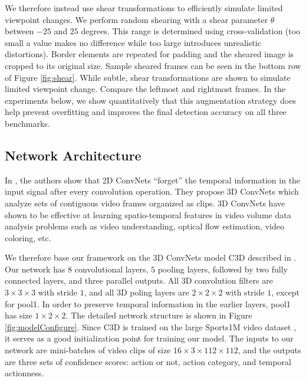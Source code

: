 \documentclass[10pt,twocolumn,letterpaper]{article}
\begin{document}
We therefore instead use shear transformations to efficiently simulate limited viewpoint changes. We perform random shearing with a shear parameter $\theta$ between $-25$ and $25$ degrees. This range is determined using cross-validation (too small a value makes no difference while too large introduces unrealistic distortions). Border elements are repeated for padding and the sheared image is cropped to its original size. Sample sheared frames can be seen in the bottom row of Figure \ref{fig:shear}. While subtle, shear transformations are shown to simulate limited viewpoint change. Compare the leftmost and rightmost frames. In the experiments below, we show quantitatively that this augmentation strategy does help prevent overfitting and improves the final detection accuracy on all three benchmarks.

\subsection{Network Architecture}
\label{sec:architecture}
In \cite{c3d2015}, the authors show that 2D ConvNets ``forget'' the temporal information in the input signal after every convolution operation. They propose 3D ConvNets which analyze sets of contiguous video frames organized as clips. 3D ConvNets have shown to be effective at learning spatio-temporal features in video volume data analysis problems \cite{vox2vox_cvprw16_dutran} such as video understanding, optical flow estimation, video coloring, etc.

We therefore base our framework on the 3D ConvNets model C3D described in \cite{c3d2015}. Our network has $8$ convolutional layers, $5$ pooling layers, followed by two fully connected layers, and three parallel outputs. All 3D convolution filters are $3 \times 3 \times 3$ with stride $1$, and all 3D poling layers are $2 \times 2 \times 2$ with stride $1$, except for \textsf{pool1}. In order to preserve temporal information in the earlier layers, \textsf{pool1} has size $1 \times 2 \times 2$. The detailed network structure is shown in Figure \ref{fig:modelConfigure}. 
Since C3D is trained on the large Sports1M video dataset \cite{KarpathyCVPR14}, it serves as a good initialization point for training our model. The inputs to our network are mini-batches of video clips of size $16 \times 3 \times 112 \times 112$, and the outputs are three sets of confidence scores: action or not, action category, and temporal actionness.
\end{document}

